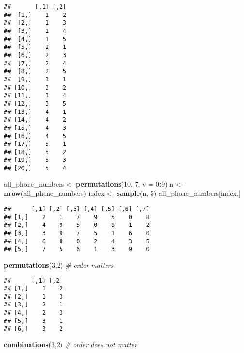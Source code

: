 \documentclass[
]{article}
\newenvironment{Shaded}{\begin{snugshade}}{\end{snugshade}}
\newcommand{\CommentTok}[1]{\textcolor[rgb]{0.56,0.35,0.01}{\textit{#1}}}
\newcommand{\DataTypeTok}[1]{\textcolor[rgb]{0.13,0.29,0.53}{#1}}
\newcommand{\DecValTok}[1]{\textcolor[rgb]{0.00,0.00,0.81}{#1}}
\newcommand{\KeywordTok}[1]{\textcolor[rgb]{0.13,0.29,0.53}{\textbf{#1}}}
\newcommand{\NormalTok}[1]{#1}
\newcommand{\OperatorTok}[1]{\textcolor[rgb]{0.81,0.36,0.00}{\textbf{#1}}}
\newcommand{\StringTok}[1]{\textcolor[rgb]{0.31,0.60,0.02}{#1}}
\begin{document}
\begin{verbatim}
##       [,1] [,2]
##  [1,]    1    2
##  [2,]    1    3
##  [3,]    1    4
##  [4,]    1    5
##  [5,]    2    1
##  [6,]    2    3
##  [7,]    2    4
##  [8,]    2    5
##  [9,]    3    1
## [10,]    3    2
## [11,]    3    4
## [12,]    3    5
## [13,]    4    1
## [14,]    4    2
## [15,]    4    3
## [16,]    4    5
## [17,]    5    1
## [18,]    5    2
## [19,]    5    3
## [20,]    5    4
\end{verbatim}

\begin{Shaded}
\begin{Highlighting}[]
\NormalTok{all\_phone\_numbers \textless{}{-}}\StringTok{ }\KeywordTok{permutations}\NormalTok{(}\DecValTok{10}\NormalTok{, }\DecValTok{7}\NormalTok{, }\DataTypeTok{v =} \DecValTok{0}\OperatorTok{:}\DecValTok{9}\NormalTok{)}
\NormalTok{n \textless{}{-}}\StringTok{ }\KeywordTok{nrow}\NormalTok{(all\_phone\_numbers)}
\NormalTok{index \textless{}{-}}\StringTok{ }\KeywordTok{sample}\NormalTok{(n, }\DecValTok{5}\NormalTok{)}
\NormalTok{all\_phone\_numbers[index,]}
\end{Highlighting}
\end{Shaded}

\begin{verbatim}
##      [,1] [,2] [,3] [,4] [,5] [,6] [,7]
## [1,]    2    1    7    9    5    0    8
## [2,]    4    9    5    0    8    1    2
## [3,]    3    9    7    5    1    6    0
## [4,]    6    8    0    2    4    3    5
## [5,]    7    5    6    1    3    9    0
\end{verbatim}

\begin{Shaded}
\begin{Highlighting}[]
\KeywordTok{permutations}\NormalTok{(}\DecValTok{3}\NormalTok{,}\DecValTok{2}\NormalTok{)    }\CommentTok{\# order matters}
\end{Highlighting}
\end{Shaded}

\begin{verbatim}
##      [,1] [,2]
## [1,]    1    2
## [2,]    1    3
## [3,]    2    1
## [4,]    2    3
## [5,]    3    1
## [6,]    3    2
\end{verbatim}

\begin{Shaded}
\begin{Highlighting}[]
\KeywordTok{combinations}\NormalTok{(}\DecValTok{3}\NormalTok{,}\DecValTok{2}\NormalTok{)    }\CommentTok{\# order does not matter}
\end{Highlighting}
\end{Shaded}
\end{document}
